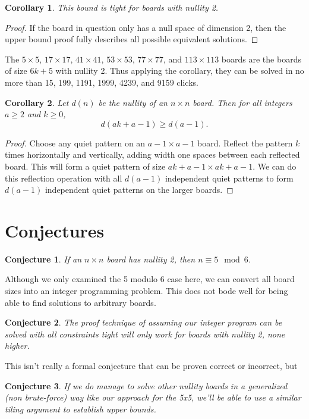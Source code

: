 \documentclass{article}
\newtheorem{corollary}{Corollary}
\newtheorem{conjecture}{Conjecture}
\begin{document}
	\begin{corollary}
		This bound is tight for boards with nullity 2.
	\end{corollary}
	\begin{proof}
		If the board in question only has a null space of dimension 2, then the upper bound proof fully describes all possible equivalent solutions.
	\end{proof}

	The $5 \times 5$, $17 \times 17$, $41 \times 41$, $53 \times 53$, $77 \times 77$, and $113 \times 113$ boards are the boards of size $6k+5$ with nullity 2.
	Thus applying the corollary, they can be solved in no more than 15, 199, 1191, 1999, 4239, and 9159 clicks.
	
	\begin{corollary}
		Let $d(n)$ be the nullity of an $n \times n$ board.
		Then for all integers $a \geq 2$ and $k \geq 0$,
		\begin{equation*}
			d(ak + a - 1) \geq d(a-1).
		\end{equation*}
	\end{corollary}
	\begin{proof}
		Choose any quiet pattern on an $a-1 \times a-1$ board.
		Reflect the pattern $k$ times horizontally and vertically, adding width one spaces between each reflected board.
		This will form a quiet pattern of size $ak + a-1 \times ak + a-1$.
		We can do this reflection operation with all $d(a-1)$ independent quiet patterns to form $d(a-1)$ independent quiet patterns on the larger boards.
	\end{proof}
	
	\section{Conjectures}
	\begin{conjecture}
		If an $n \times n$ board has nullity 2, then $n \equiv 5 \mod 6$.
	\end{conjecture}

	Although we only examined the 5 modulo 6 case here, we can convert all board sizes into an integer programming problem.
	This does not bode well for being able to find solutions to arbitrary boards.
	\begin{conjecture}
		The proof technique of assuming our integer program can be solved with all constraints tight will only work for boards with nullity 2, none higher.
	\end{conjecture}

	This isn't really a formal conjecture that can be proven correct or incorrect, but
	\begin{conjecture}
		If we do manage to solve other nullity boards in a generalized (non brute-force) way like our approach for the 5x5, we'll be able to use a similar tiling argument to establish upper bounds.
	\end{conjecture}
\end{document}
